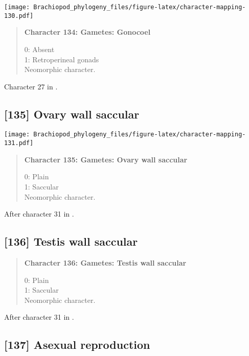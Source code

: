 \documentclass[openany]{book}
\theoremstyle{definition}
\theoremstyle{definition}
\theoremstyle{definition}
\theoremstyle{remark}
\begin{document}
\texttt{[image: Brachiopod\_phylogeny\_files/figure-latex/character-mapping-130.pdf]}

\begin{quote}
\textbf{Character 134: Gametes: Gonocoel}

0: Absent\\
1: Retroperineal gonads\\
Neomorphic character.
\end{quote}

Character 27 in \citet{Haszprunar1996}.

\subsection*{{[}135{]} Ovary wall saccular}\label{ovary-wall-saccular}

\texttt{[image: Brachiopod\_phylogeny\_files/figure-latex/character-mapping-131.pdf]}

\begin{quote}
\textbf{Character 135: Gametes: Ovary wall saccular}

0: Plain\\
1: Saccular\\
Neomorphic character.
\end{quote}

After character 31 in \citet{Haszprunar1996}.

\subsection*{{[}136{]} Testis wall saccular}\label{testis-wall-saccular}

\begin{quote}
\textbf{Character 136: Gametes: Testis wall saccular}

0: Plain\\
1: Saccular\\
Neomorphic character.
\end{quote}

After character 31 in \citet{Haszprunar1996}.

\subsection*{{[}137{]} Asexual reproduction}\label{asexual-reproduction}
\end{document}
